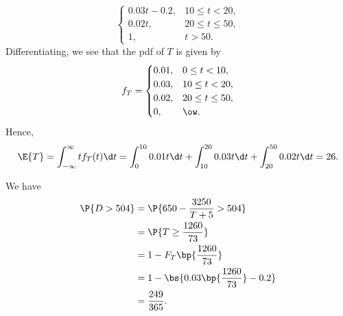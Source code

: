 \begin{solution}
\begin{ppart}
\[\begin{cases}
            0.03t - 0.2, & 10 \leq t < 20,\\
            0.02t, & 20 \leq t \leq 50,\\
            1 , & t > 50.
        \end{cases}\]
        Differentiating, we see that the pdf of $T$ is given by \[f_T = \begin{cases}
            0.01, & 0 \leq t < 10,\\
            0.03, & 10 \leq t < 20,\\
            0.02, & 20 \leq t \leq 50,\\
            0, & \ow.
        \end{cases}\]
        Hence, \[\E{T} = \int_{-\infty}^\infty tf_T(t) \d t = \int_0^{10} 0.01t \d t + \int_{10}^{20} 0.03t \d t + \int_{20}^{50} 0.02t \d t = 26.\]
    \end{ppart}
    \begin{ppart}
        We have
        \begin{align*}
            \P{D > 504} &= \P{650 - \frac{3250}{T + 5} > 504}\\
            &= \P{T \geq \frac{1260}{73}}\\
            &= 1 - F_T\bp{\frac{1260}{73}}\\
            &= 1 - \bs{0.03\bp{\frac{1260}{73}} - 0.2}\\
            &= \frac{249}{365}.
        \end{align*}
    \end{ppart}
\end{solution}

